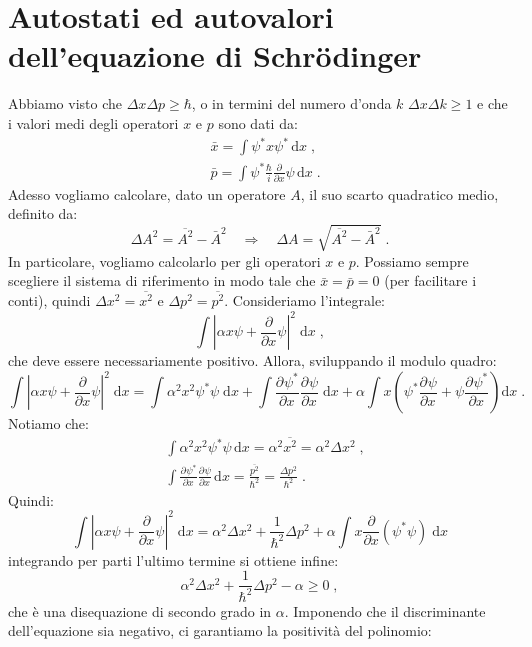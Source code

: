 \documentclass[10pt,a4paper]{report}
\theoremstyle{definition}
\newcommand{\pdev}[3][]{\frac{\partial^{#1} #2}{\partial #3^{#1}}}
\numberwithin{equation}{section}
\newcommand{\diff}[1][]{\mathrm{d}#1}
\begin{document}
\section{Autostati ed autovalori dell'equazione di Schrödinger}
Abbiamo visto che $\Delta x\Delta p\ge \hbar$, o in termini del numero d'onda $k$ $\Delta x\Delta k\ge 1$ e che i valori medi degli 
operatori $x$ e $p$ sono dati da:
\begin{align*}
&\bar{x}=\int\psi^* x\psi^*\,\diff{x}\;, \\
&\bar{p}=\int\psi^*\frac{\hbar}{i}\frac{\partial}{\partial x}\psi\,\diff{x}\;.
\end{align*}
Adesso vogliamo calcolare, dato un operatore $A$, il suo scarto quadratico medio, definito da:
$$
\Delta A^2=\overline{A^2}-\bar{A}^2\quad  \Longrightarrow\quad \Delta A=\sqrt{\overline{A^2}-\bar{A}^2}\;.
$$
In particolare, vogliamo calcolarlo per gli operatori $x$ e $p$. Possiamo sempre scegliere il sistema di riferimento in modo tale 
che $\bar{x}=\bar{p}=0$ (per facilitare i conti), quindi $\Delta x^2=\overline{x^2}$ e $\Delta p^2=\overline{p^2}$. Consideriamo 
l'integrale:
\begin{equation}
 \int \left|\alpha x\psi+\frac{\partial}{\partial x}\psi\right|^2\;\diff{x}\;,
\end{equation}
che deve essere necessariamente positivo. Allora, sviluppando il modulo quadro:
$$
 \int \left|\alpha x\psi+\frac{\partial}{\partial x}\psi\right|^2\;\diff{x} = \int \alpha^2 x^2 \psi^*\psi\;\diff{x}+\int \pdev{\psi^*}
 {x}\pdev{\psi}{x}\;\diff{x}+\alpha\int x\left(\psi^*\pdev{\psi}{x}+\psi\pdev{\psi^*}{x}\right)\diff{x}\;.
 $$
 Notiamo che:
 \begin{align}
 &\int\alpha^2x^2\psi^*\psi\,\diff{x}=\alpha^2\overline{x^2}=\alpha^2\Delta x^2\;, \\
 &\int \pdev{\psi^*}{x}\pdev{\psi}{x}\,\diff{x}=\frac{\overline{p^2}}{\hbar^2}=\frac{\Delta p^2}{\hbar^2}\;.
 \end{align}
Quindi:
$$
 \int \left|\alpha x\psi+\frac{\partial}{\partial x}\psi\right|^2\;\diff{x}=\alpha^2\Delta x^2+\frac{1}{\hbar^2}\Delta p^2+\alpha\int x
 \frac{\partial}{\partial x}(\psi^*\psi)\;\diff{x}
 $$
 integrando per parti l'ultimo termine si ottiene infine:
 \begin{equation}
  \alpha^2\Delta x^2+\frac{1}{\hbar^2}\Delta p^2-\alpha\ge 0\;,
 \end{equation}
 che è una disequazione di secondo grado in $\alpha$. Imponendo che il discriminante dell'equazione sia negativo, ci garantiamo la 
 positività del polinomio:
\end{document}

